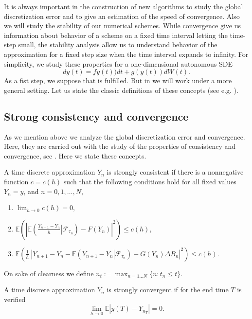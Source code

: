 	It is always important in the construction of  new algorithms to study  the global
discretization error and to give an estimation of the speed of convergence. 
Also we will study the stability of our numerical schemes. While convergence give us
information about behavior of a scheme on a fixed time interval letting the time-step small, the stability analysis
allow us to understand behavior of the approximation for a fixed step size when the time interval expands to infinity.
For simplicity, we study these properties for a one-dimensional autonomous SDE
\begin{equation}\label{eqn:autonomousSDE}
	dy(t)=fy(t))dt+g(y(t))dW(t).
\end{equation}
	As a fist step, we suppose that  is fulfilled. But in  
we will work under a more general setting. Let us state the classic definitions of these concepts (see e.g. 
\cite{Kloeden1992}).
\subsection{Strong consistency and convergence}\label{sec3}
		As we mention above we  analyze the global discretization error and convergence. 
	 Here, they are	carried out with  the study of the properties of consistency and convergence, see
	\cite{Kloeden1992}. Here we state these concepts.
	\begin{dfn}\label{dfn:Consistency}
		A time discrete approximation $Y_n$ is strongly consistent if there is a nonnegative
		function $c=c(h)$ such that the following conditions hold for all fixed values $Y_n=y$,
		and $n=0,1,\dots, N$,
		\begin{enumerate}%
			\item \label{eqn:DefConsitenceA}
		$\displaystyle \lim_{h\rightarrow 0} c(h)=0$,
			\item\label{eqn:DefConsitenceB}
		$\displaystyle \mathbb{E} \left(\left| \mathbb{E} \left(
				\frac{Y_{n+1}-Y_n}{h} \left|\mathcal{F}_{\tau_n}\right.
			\right)-F\left( Y_n \right)\right|^2 \right)\leq c(h),$
			\item \label{eqn:DefConsitenceC}
		$ \displaystyle  \mathbb{E} \left(\frac{1}{h} \
		\left|Y_{n+1}-Y_n-\mathbb{E}\left(Y_{n+1}-Y_n
		\left| \mathcal{F}_{\tau_n}\right.\right)-G\left(Y_n\right)
		\Delta B_n\right|^2 \right) \leq c(h)$.
		\end{enumerate}
	\end{dfn}
	On sake of clearness we define
	$\displaystyle n_t:= \max_{n=1 \ldots N}\{n: t_n\leq t\}$.
	\begin{dfn}
	A time discrete approximation $Y_n$ is strongly convergent  if for the end time $T$ is
	verified
	\begin{equation*}
		\lim_{h \rightarrow 0}
		\mathbb{E}\left| y(T)-Y_{n_T}\right|=0.
	\end{equation*}
	\end{dfn}

